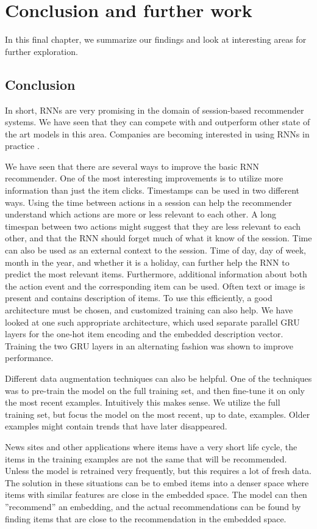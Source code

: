 \chapter{Conclusion and further work}
In this final chapter, we summarize our findings and look at interesting areas for further exploration.

\section{Conclusion}
In short, RNNs are very promising in the domain of session-based recommender systems. We have seen that they can compete with and outperform other state of the art models in this area. Companies are becoming interested in using RNNs in practice \cite{ZALANDO:understanding-consumer-histories}.

We have seen that there are several ways to improve the basic RNN recommender. One of the most interesting improvements is to utilize more information than just the item clicks. Timestamps can be used in two different ways. Using the time between actions in a session can help the recommender understand which actions are more or less relevant to each other. A long timespan between two actions might suggest that they are less relevant to each other, and that the RNN should forget much of what it know of the session. Time can also be used as an external context to the session. Time of day, day of week, month in the year, and whether it is a holiday, can further help the RNN to predict the most relevant items. Furthermore, additional information about both the action event and the corresponding item can be used. Often text or image is present and contains description of items. To use this efficiently, a good architecture must be chosen, and customized training can also help. We have looked at one such appropriate architecture, which used separate parallel GRU layers for the one-hot item encoding and the embedded description vector. Training the two GRU layers in an alternating fashion was shown to improve performance.

Different data augmentation techniques can also be helpful. One of the techniques was to pre-train the model on the full training set, and then fine-tune it on only the most recent examples. Intuitively this makes sense. We utilize the full training set, but focus the model on the most recent, up to date, examples. Older examples might contain trends that have later disappeared. 

News sites and other applications where items have a very short life cycle, the items in the training examples are not the same that will be recommended. Unless the model is retrained very frequently, but this requires a lot of fresh data. The solution in these situations can be to embed items into a denser space where items with similar features are close in the embedded space. The model can then ''recommend'' an embedding, and the actual recommendations can be found by finding items that are close to the recommendation in the embedded space.

